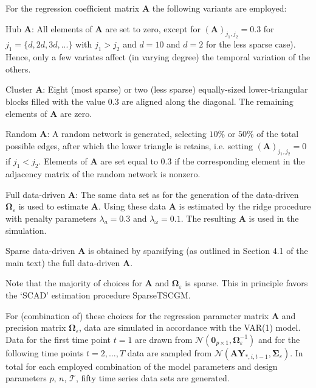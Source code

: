 \documentclass[a4paper]{article}
\begin{document}
\noindent
For the regression coefficient matrix $\mathbf{A}$ the following variants are employed:
\begin{compactitem}
\item Hub $\mathbf{A}$: All elements of $\mathbf{A}$ are set to zero, except for $(\mathbf{A})_{j_1, j_2}=0.3$ for $j_1=\{d,2d,3d,...\}$ with $j_1>j_2$ and $d=10$ and $d=2$ for the less sparse case). Hence, only a few variates affect (in varying degree) the temporal variation of the others.

\item Cluster $\mathbf{A}$: Eight (most sparse)  or two (less sparse) equally-sized lower-triangular blocks filled with the value 0.3 are aligned along the diagonal. The remaining elements of $\mathbf{A}$ are zero.

\item Random $\mathbf{A}$: A random network is generated, selecting $10\%$  or $50\%$ of the total possible edges, after which the lower triangle is retains, i.e. setting $(\mathbf{A})_{j_1, j_2}=0$ if $j_1<j_2$. Elements of $\mathbf{A}$ are set equal to $0.3$ if the corresponding element in the adjacency matrix of the random network is nonzero.

\item Full data-driven $\mathbf{A}$: The same data set as for the generation of the data-driven $\mathbf{\Omega}_{\varepsilon}$ is used to estimate $\mathbf{A}$. Using these data $\mathbf{A}$ is estimated by the ridge procedure with penalty parameters $\lambda_a=0.3$ and $\lambda_{\omega}=0.1$. The resulting $\mathbf{A}$ is used in the simulation.

\item Sparse data-driven $\mathbf{A}$ is obtained by sparsifying (as outlined in Section 4.1 of the main text) the full data-driven $\mathbf{A}$.
\end{compactitem}
Note that the majority of choices for $\mathbf{A}$ and $\mathbf{\Omega}_{\varepsilon}$ is sparse. This in principle favors the `SCAD' estimation procedure SparseTSCGM.

For (combination of) these choices for the regression parameter matrix $\mathbf{A}$ and precision matrix $\mathbf{\Omega}_{\varepsilon}$, data are simulated in accordance with the VAR(1) model. Data for the first time point $t=1$ are drawn from $\mathcal{N}(\mathbf{0}_{p \times 1}, \mathbf{\Omega}_{\varepsilon}^{-1})$ and for the following time points $t=2,...,T$ data are sampled from $\mathcal{N}(\mathbf{A}\mathbf{Y}_{*,i,t-1},\mathbf{\Sigma}_{\varepsilon})$. In total for each employed combination of the model parameters and design parameters $p$, $n$, $\mathcal{T}$, fifty time series data sets are generated.
\end{document}
